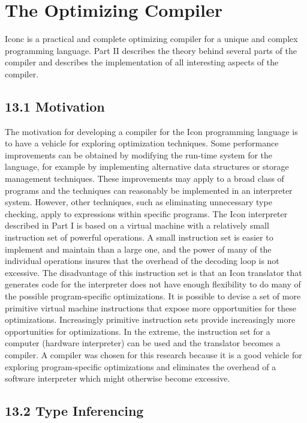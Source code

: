 \chapter{The Optimizing Compiler}

Iconc is a practical and complete optimizing compiler for a unique and
complex programming language. Part II describes the theory behind
several parts of the compiler and describes the implementation of all
interesting aspects of the compiler.

\section[13.1 Motivation]{13.1 Motivation}


The motivation for developing a compiler for the Icon programming
language is to have a vehicle for exploring optimization
techniques. Some performance improvements can be obtained by modifying
the run-time system for the language, for example by implementing
alternative data structures or storage management techniques. These
improvements may apply to a broad class of programs and the techniques
can reasonably be implemented in an interpreter system.  However,
other techniques, such as eliminating unnecessary type checking, apply
to expressions within specific programs. The Icon interpreter
described in Part I is based on a virtual machine with a relatively
small instruction set of powerful operations. A small instruction set
is easier to implement and maintain than a large one, and the power of
many of the individual operations insures that the overhead of the
decoding loop is not excessive. The disadvantage of this instruction
set is that an Icon translator that generates code for the interpreter
does not have enough flexibility to do many of the possible
program-specific optimizations. It is possible to devise a set of more
primitive virtual machine instructions that expose more opportunities
for these optimizations. Increasingly primitive instruction sets
provide increasingly more opportunities for optimizations. In the
extreme, the instruction set for a computer (hardware interpreter) can
be used and the translator becomes a compiler. A compiler was chosen
for this research because it is a good vehicle for exploring
program-specific optimizations and eliminates the overhead of a
software interpreter which might otherwise become excessive.

\section[13.2 Type Inferencing]{13.2 Type Inferencing}

